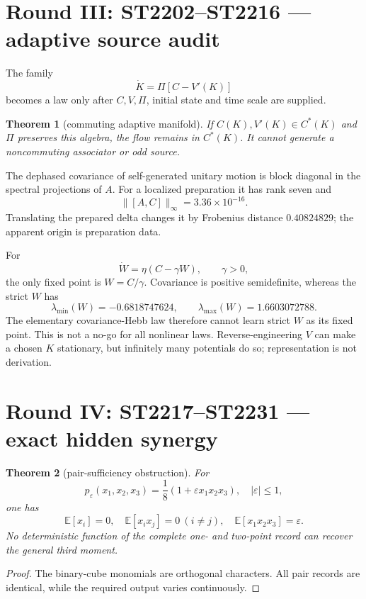 \documentclass[11pt,a4paper]{article}
\newtheorem{theorem}{Theorem}
\begin{document}
\section{Round III: ST2202--ST2216 --- adaptive source audit}

The family
\[
 \dot K=\Pi[C-V'(K)]
\]
becomes a law only after \(C,V,\Pi\), initial state and time scale are supplied.

\begin{theorem}[commuting adaptive manifold]
If \(C(K),V'(K)\in C^*(K)\) and \(\Pi\) preserves this algebra, the flow remains
in \(C^*(K)\).  It cannot generate a noncommuting associator or odd source.
\end{theorem}

The dephased covariance of self-generated unitary motion is block diagonal in
the spectral projections of \(A\).  For a localized preparation it has rank
seven and
\[
 \|[A,C]\|_\infty=3.36\times10^{-16}.
\]
Translating the prepared delta changes it by Frobenius distance \(0.40824829\);
the apparent origin is preparation data.

For
\[
 \dot W=\eta(C-\gamma W),\qquad\gamma>0,
\]
the only fixed point is \(W=C/\gamma\).  Covariance is positive semidefinite,
whereas the strict \(W\) has
\[
 \lambda_{\min}(W)=-0.6818747624,\qquad
 \lambda_{\max}(W)=1.6603072788.
\]
The elementary covariance-Hebb law therefore cannot learn strict \(W\) as its
fixed point.  This is not a no-go for all nonlinear laws.  Reverse-engineering
\(V\) can make a chosen \(K\) stationary, but infinitely many potentials do
so; representation is not derivation.

\section{Round IV: ST2217--ST2231 --- exact hidden synergy}

\begin{theorem}[pair-sufficiency obstruction]
For
\[
 p_\varepsilon(x_1,x_2,x_3)
 =\frac18(1+\varepsilon x_1x_2x_3),\quad|\varepsilon|\leq1,
\]
one has
\[
 \mathbb E[x_i]=0,\quad
 \mathbb E[x_ix_j]=0\ (i\neq j),\quad
 \mathbb E[x_1x_2x_3]=\varepsilon.
\]
No deterministic function of the complete one- and two-point record can
recover the general third moment.
\end{theorem}
\begin{proof}
The binary-cube monomials are orthogonal characters.  All pair records are
identical, while the required output varies continuously.
\end{proof}
\end{document}
